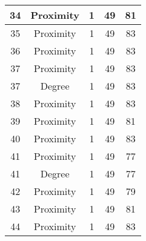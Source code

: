 \documentclass[results.tex]{subfiles}
\begin{document}
\begin{center}
\begin{tabular}{| c || c | c | c | c |}
            \hline
            34                      & Proximity                    & 1                      & 49                      & 81                   \\
            \hline
            35                      & Proximity                    & 1                      & 49                      & 83                   \\
            \hline
            36                      & Proximity                    & 1                      & 49                      & 83                   \\
            \hline
            37                      & Proximity                    & 1                      & 49                      & 83                   \\
            \hline
            37                      & Degree                       & 1                      & 49                      & 83                   \\
            \hline
            38                      & Proximity                    & 1                      & 49                      & 83                   \\
            \hline
            39                      & Proximity                    & 1                      & 49                      & 81                   \\
            \hline
            40                      & Proximity                    & 1                      & 49                      & 83                   \\
            \hline
            41                      & Proximity                    & 1                      & 49                      & 77                   \\
            \hline
            41                      & Degree                       & 1                      & 49                      & 77                   \\
            \hline
            42                      & Proximity                    & 1                      & 49                      & 79                   \\
            \hline
            43                      & Proximity                    & 1                      & 49                      & 81                   \\
            \hline
            44                      & Proximity                    & 1                      & 49                      & 83                   \\

\end{tabular}
\end{center}
\end{document}
